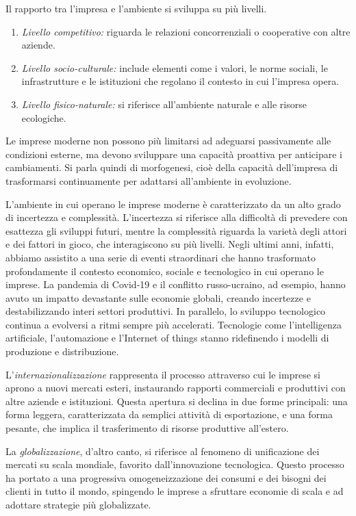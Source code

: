 Il rapporto tra l’impresa e l’ambiente si sviluppa su più livelli. 
\begin{enumerate}
    \item \textit{Livello competitivo:} riguarda le relazioni concorrenziali o cooperative con altre aziende.
    \item \textit{Livello socio-culturale:} include elementi come i valori, le norme sociali, le infrastrutture e le istituzioni che regolano il contesto in cui l’impresa opera.
    \item \textit{Livello fisico-naturale:} si riferisce all'ambiente naturale e alle risorse ecologiche. 
\end{enumerate}
Le imprese moderne non possono più limitarsi ad adeguarsi passivamente alle condizioni esterne, ma devono sviluppare una capacità proattiva per anticipare i cambiamenti. Si parla quindi di morfogenesi, cioè della capacità dell'impresa di trasformarsi continuamente per adattarsi all'ambiente in evoluzione.

L’ambiente in cui operano le imprese moderne è caratterizzato da un alto grado di incertezza e complessità. L’incertezza si riferisce alla difficoltà di prevedere con esattezza gli sviluppi futuri, mentre la complessità riguarda la varietà degli attori e dei fattori in gioco, che interagiscono su più livelli. Negli ultimi anni, infatti, abbiamo assistito a una serie di eventi straordinari che hanno trasformato profondamente il contesto economico, sociale e tecnologico in cui operano le imprese. La pandemia di Covid-19 e il conflitto russo-ucraino, ad esempio, hanno avuto un impatto devastante sulle economie globali, creando incertezze e destabilizzando interi settori produttivi. In parallelo, lo sviluppo tecnologico continua a evolversi a ritmi sempre più accelerati. Tecnologie come l’intelligenza artificiale, l’automazione e l’Internet of things stanno ridefinendo i modelli di produzione e distribuzione.

L’\textit{internazionalizzazione} rappresenta il processo attraverso cui le imprese si aprono a nuovi mercati esteri, instaurando rapporti commerciali e produttivi con altre aziende e istituzioni. Questa apertura si declina in due forme principali: una forma leggera, caratterizzata da semplici attività di esportazione, e una forma pesante, che implica il trasferimento di risorse produttive all’estero.

La \textit{globalizzazione}, d’altro canto, si riferisce al fenomeno di unificazione dei mercati su scala mondiale, favorito dall’innovazione tecnologica. Questo processo ha portato a una progressiva omogeneizzazione dei consumi e dei bisogni dei clienti in tutto il mondo, spingendo le imprese a sfruttare economie di scala e ad adottare strategie più globalizzate. 

